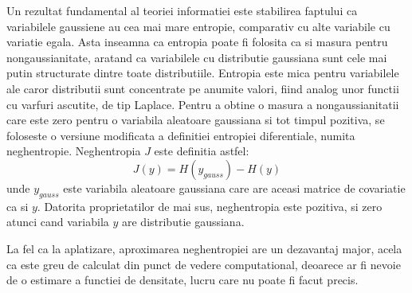 \documentclass[12pt,oneside]{article}
\begin{document}
Un rezultat fundamental al teoriei informatiei este stabilirea faptului ca variabilele gaussiene au cea mai mare entropie, comparativ cu alte variabile cu variatie egala. Asta inseamna ca entropia poate fi folosita ca si masura pentru nongaussianitate, aratand ca variabilele cu distributie gaussiana sunt cele mai putin structurate dintre toate distributiile. Entropia este mica pentru variabilele ale caror distributii sunt concentrate pe anumite valori, fiind analog unor functii cu varfuri ascutite, de tip Laplace. Pentru a obtine o masura a nongaussianitatii care este zero pentru o variabila aleatoare gaussiana si tot timpul pozitiva, se foloseste o versiune modificata a definitiei entropiei diferentiale, numita neghentropie. Neghentropia $J$ este definitia astfel:
\begin{equation}
	J(y)=H(y_{gauss})-H(y)	
\end{equation}
unde $y_{gauss}$ este variabila aleatoare gaussiana care are aceasi matrice de covariatie ca si $y$. Datorita proprietatilor de mai sus, neghentropia este pozitiva, si zero atunci cand variabila $y$ are distributie gaussiana. 

La fel ca la aplatizare, aproximarea neghentropiei are un dezavantaj major, acela ca este greu de calculat din punct de vedere computational, deoarece ar fi nevoie de o estimare a functiei de densitate, lucru care nu poate fi facut precis. 
\end{document}
